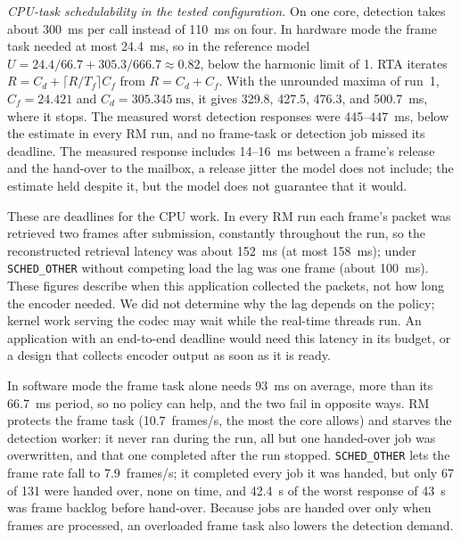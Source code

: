 \documentclass[conference]{IEEEtran}
\begin{document}
\textit{CPU-task schedulability in the tested configuration.} On one core, detection takes about \SI{300}{\milli\second} per call instead of \SI{110}{\milli\second} on four. In hardware mode the frame task needed at most \SI{24.4}{\milli\second}, so in the reference model $U = 24.4/66.7 + 305.3/666.7 \approx 0.82$, below the harmonic limit of 1. RTA iterates $R = C_d + \lceil R/T_f \rceil C_f$ from $R = C_d + C_f$. With the unrounded maxima of run~1, $C_f = 24.421$ and $C_d = \SI{305.345}{\milli\second}$, it gives 329.8, 427.5, 476.3, and \SI{500.7}{\milli\second}, where it stops. The measured worst detection responses were 445--\SI{447}{\milli\second}, below the estimate in every RM run, and no frame-task or detection job missed its deadline. The measured response includes 14--\SI{16}{\milli\second} between a frame's release and the hand-over to the mailbox, a release jitter the model does not include; the estimate held despite it, but the model does not guarantee that it would.

These are deadlines for the CPU work. In every RM run each frame's packet was retrieved two frames after submission, constantly throughout the run, so the reconstructed retrieval latency was about \SI{152}{\milli\second} (at most \SI{158}{\milli\second}); under \texttt{SCHED\_OTHER} without competing load the lag was one frame (about \SI{100}{\milli\second}). These figures describe when this application collected the packets, not how long the encoder needed. We did not determine why the lag depends on the policy; kernel work serving the codec may wait while the real-time threads run. An application with an end-to-end deadline would need this latency in its budget, or a design that collects encoder output as soon as it is ready.

In software mode the frame task alone needs \SI{93}{\milli\second} on average, more than its \SI{66.7}{\milli\second} period, so no policy can help, and the two fail in opposite ways. RM protects the frame task (10.7~frames/s, the most the core allows) and starves the detection worker: it never ran during the run, all but one handed-over job was overwritten, and that one completed after the run stopped. \texttt{SCHED\_OTHER} lets the frame rate fall to 7.9~frames/s; it completed every job it was handed, but only 67 of 131 were handed over, none on time, and \SI{42.4}{\second} of the worst response of \SI{43}{\second} was frame backlog before hand-over. Because jobs are handed over only when frames are processed, an overloaded frame task also lowers the detection demand.
\end{document}
